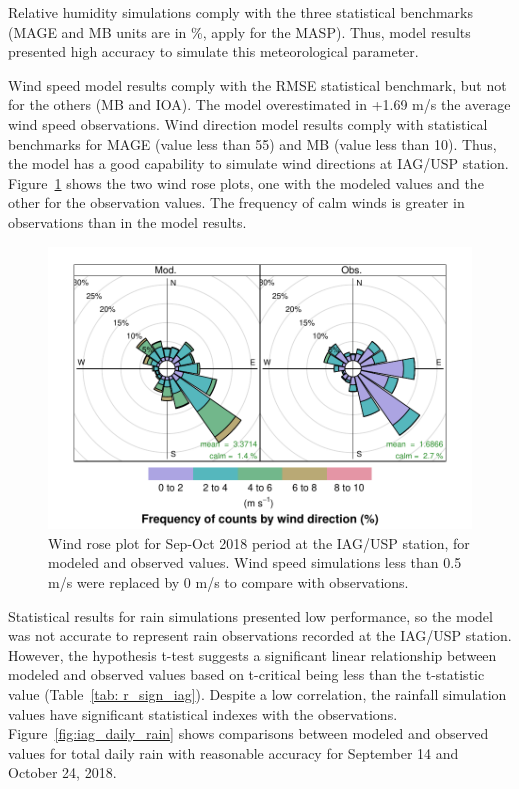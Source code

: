 Relative humidity simulations comply with the three statistical benchmarks (MAGE and MB units are in \%, apply for the MASP).
Thus, model results presented high accuracy to simulate this meteorological parameter.

Wind speed model results comply with the RMSE statistical benchmark, but not for the others (MB and IOA).
The model overestimated in +1.69 m/s the average wind speed observations.
Wind direction model results comply with statistical benchmarks for MAGE (value less than 55) and MB (value less than 10).
Thus, the model has a good capability to simulate wind directions at IAG/USP station.
Figure~\ref{fig:wrplot_iag} shows the two wind rose plots, one with the modeled values and the other for the observation values. The frequency of calm winds is greater in observations than in the model results.

\begin{figure}[!hbt]
  \centering
  \includegraphics{fig/WRplot_IAG_sep_oct2018}
  \caption{Wind rose plot for Sep-Oct 2018 period at the IAG/USP station, for modeled and observed values. Wind speed simulations less than 0.5 m/s were replaced by 0 m/s to compare with observations.}
  \label{fig:wrplot_iag}
\end{figure}

Statistical results for rain simulations presented low performance, so the model was not accurate to represent rain observations recorded at the IAG/USP station.
However, the hypothesis t-test suggests a significant linear relationship between modeled and observed values based on t-critical being less than the t-statistic value (Table~\ref{tab: r_sign_iag}).
Despite a low correlation, the rainfall simulation values have significant statistical indexes with the observations. 
Figure~\ref{fig:iag_daily_rain} shows comparisons between modeled and observed values for total daily rain with reasonable accuracy for September 14 and October 24, 2018.

